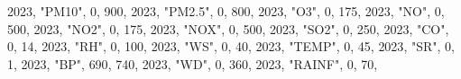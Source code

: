 \documentclass[
  letterpaper,
  DIV=11,
  numbers=noendperiod]{scrartcl}
\newenvironment{Shaded}{\begin{snugshade}}{\end{snugshade}}
\newcommand{\DecValTok}[1]{\textcolor[rgb]{0.68,0.00,0.00}{#1}}
\newcommand{\NormalTok}[1]{\textcolor[rgb]{0.00,0.23,0.31}{#1}}
\newcommand{\StringTok}[1]{\textcolor[rgb]{0.13,0.47,0.30}{#1}}
\begin{document}
\begin{Shaded}
\begin{Highlighting}[]
  \DecValTok{2023}\NormalTok{, }\StringTok{"PM10"}\NormalTok{, }\DecValTok{0}\NormalTok{, }\DecValTok{900}\NormalTok{,}
  \DecValTok{2023}\NormalTok{, }\StringTok{"PM2.5"}\NormalTok{, }\DecValTok{0}\NormalTok{, }\DecValTok{800}\NormalTok{,}
  \DecValTok{2023}\NormalTok{, }\StringTok{"O3"}\NormalTok{, }\DecValTok{0}\NormalTok{, }\DecValTok{175}\NormalTok{,}
  \DecValTok{2023}\NormalTok{, }\StringTok{"NO"}\NormalTok{, }\DecValTok{0}\NormalTok{, }\DecValTok{500}\NormalTok{,}
  \DecValTok{2023}\NormalTok{, }\StringTok{"NO2"}\NormalTok{, }\DecValTok{0}\NormalTok{, }\DecValTok{175}\NormalTok{,}
  \DecValTok{2023}\NormalTok{, }\StringTok{"NOX"}\NormalTok{, }\DecValTok{0}\NormalTok{, }\DecValTok{500}\NormalTok{,}
  \DecValTok{2023}\NormalTok{, }\StringTok{"SO2"}\NormalTok{, }\DecValTok{0}\NormalTok{, }\DecValTok{250}\NormalTok{,}
  \DecValTok{2023}\NormalTok{, }\StringTok{"CO"}\NormalTok{, }\DecValTok{0}\NormalTok{, }\DecValTok{14}\NormalTok{,}
  \DecValTok{2023}\NormalTok{, }\StringTok{"RH"}\NormalTok{, }\DecValTok{0}\NormalTok{, }\DecValTok{100}\NormalTok{,}
  \DecValTok{2023}\NormalTok{, }\StringTok{"WS"}\NormalTok{, }\DecValTok{0}\NormalTok{, }\DecValTok{40}\NormalTok{,}
  \DecValTok{2023}\NormalTok{, }\StringTok{"TEMP"}\NormalTok{, }\DecValTok{0}\NormalTok{, }\DecValTok{45}\NormalTok{,}
  \DecValTok{2023}\NormalTok{, }\StringTok{"SR"}\NormalTok{, }\DecValTok{0}\NormalTok{, }\DecValTok{1}\NormalTok{,}
  \DecValTok{2023}\NormalTok{, }\StringTok{"BP"}\NormalTok{, }\DecValTok{690}\NormalTok{, }\DecValTok{740}\NormalTok{,}
  \DecValTok{2023}\NormalTok{, }\StringTok{"WD"}\NormalTok{, }\DecValTok{0}\NormalTok{, }\DecValTok{360}\NormalTok{,}
  \DecValTok{2023}\NormalTok{, }\StringTok{"RAINF"}\NormalTok{, }\DecValTok{0}\NormalTok{, }\DecValTok{70}\NormalTok{,}


\end{Highlighting}
\end{Shaded}
\end{document}
